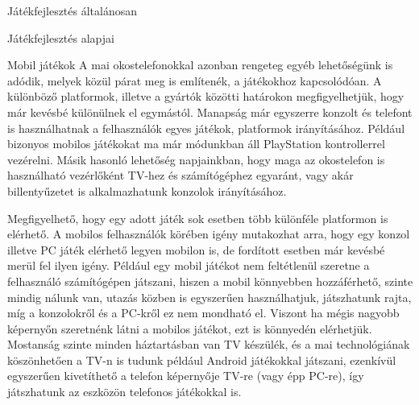 \begin{MyChapter}{Játékfejlesztés általánosan}
\begin{MySection}{Játékfejlesztés alapjai}
\begin{MySubSection}{Mobil játékok}
		A mai okostelefonokkal azonban rengeteg egyéb lehetőségünk is adódik, melyek közül párat meg is említenék, a játékokhoz kapcsolódóan. A különböző platformok, illetve a gyártók közötti határokon megfigyelhetjük, hogy már kevésbé különülnek el egymástól.
		Manapság már egyszerre konzolt és telefont is használhatnak a felhasználók egyes játékok, platformok irányításához. Például bizonyos mobilos játékokat ma már módunkban áll PlayStation kontrollerrel vezérelni. Másik hasonló lehetőség napjainkban, hogy maga az okostelefon is használható vezérlőként TV-hez és számítógéphez egyaránt, vagy akár billentyűzetet is alkalmazhatunk konzolok irányításához.
		
		Megfigyelhető, hogy egy adott játék sok esetben több különféle platformon is elérhető. A mobilos felhasználók körében igény mutakozhat arra, hogy egy konzol illetve PC játék elérhető legyen mobilon is, de fordított esetben már kevésbé merül fel ilyen igény. Például egy mobil játékot nem feltétlenül szeretne a felhasználó számítógépen játszani, hiszen a mobil könnyebben hozzáférhető, szinte mindig nálunk van, utazás közben is egyszerűen használhatjuk, játszhatunk rajta, míg a konzolokről és a PC-kről ez nem mondható el. Viszont ha mégis nagyobb képernyőn szeretnénk látni a mobilos játékot, ezt is könnyedén elérhetjük. Mostanság szinte minden háztartásban van TV készülék, és a mai technológiának köszönhetően a TV-n is tudunk például Android játékokkal játszani, ezenkívül egyszerűen kivetíthető a telefon képernyője TV-re (vagy épp PC-re), így játszhatunk az eszközön telefonos játékokkal is.
		\cite{android_tv}
		\cite{android_tv_sony}
		\cite{android_into_pc_controller}
		
		\end{MySubSection}

	\end{MySection}


\end{MyChapter}
